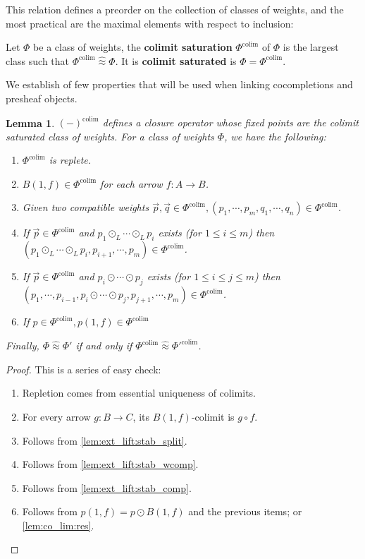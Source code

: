 \documentclass[10pt,a4paper]{article}
\newcommand{\colimeq}{\mathrel{\hat\approx}}
\DeclareMathOperator{\colim}{colim}
\theoremstyle{plain}
\newtheorem{lemma}[theorem]{Lemma}
\theoremstyle{definition}
\theoremstyle{remark}
\begin{document}
This relation defines a preorder on the collection of classes of weights, and the most practical are the maximal elements with respect to inclusion:

\begin{definition}
    Let $\Phi$ be a class of weights, the \textbf{colimit saturation} $\Phi^{\colim}$ of $\Phi$ is the largest class such that $\Phi^{\colim} \colimeq \Phi$. It is \textbf{colimit saturated} is $\Phi = \Phi^{\colim}$.
\end{definition}

We establish of few properties that will be used when linking cocompletions and presheaf objects.

\begin{lemma}
    $(-)^{\colim}$ defines a closure operator whose fixed points are the colimit saturated class of weights. For a class of weights $\Phi$, we have the following:
    \begin{enumerate}
        \item $\Phi^{\colim}$ is replete.
        \item $B(1, f)\in\Phi^{\colim}$ for each arrow $f : A \to B$.
        \item Given two compatible weights $\vec p, \vec q \in\Phi^{\colim}, (p_1, \cdots, p_m, q_1, \cdots, q_n)\in\Phi^{\colim}$.
        \item If $\vec p\in\Phi^{\colim}$ and $p_1\odot_L\cdots\odot_L p_i$ exists (for $1\leq i\leq m$) then $(p_1\odot_L \cdots\odot_L p_i, p_{i+1}, \cdots, p_m)\in\Phi^{\colim}$.
        \item If $\vec p\in\Phi^{\colim}$ and $p_i\odot\cdots\odot p_j$ exists (for $1\leq i\leq j\leq m$) then $(p_1, \cdots, p_{i-1}, p_i\odot \cdots\odot p_j, p_{j+1}, \cdots, p_m)\in\Phi^{\colim}$.
        \item If $p\in\Phi^{\colim}, p(1, f)\in\Phi^{\colim}$
    \end{enumerate}
    Finally, $\Phi\colimeq\Phi'$ if and only if $\Phi^{\colim} \colimeq\Phi'^{\colim}$.
\end{lemma}

\begin{proof}
    This is a series of easy check:
    \begin{enumerate}
        \item Repletion comes from essential uniqueness of colimits.
        \item For every arrow $g : B \to C$, its $B(1, f)$-colimit is $g\circ f$.
        \item Follows from \ref{lem:ext_lift:stab_split}.
        \item Follows from \ref{lem:ext_lift:stab_wcomp}.
        \item Follows from \ref{lem:ext_lift:stab_comp}.
        \item Follows from $p(1, f) = p\odot B(1, f)$ and the previous items; or \ref{lem:co_lim:res}.
    \end{enumerate}
\end{proof}
\end{document}
